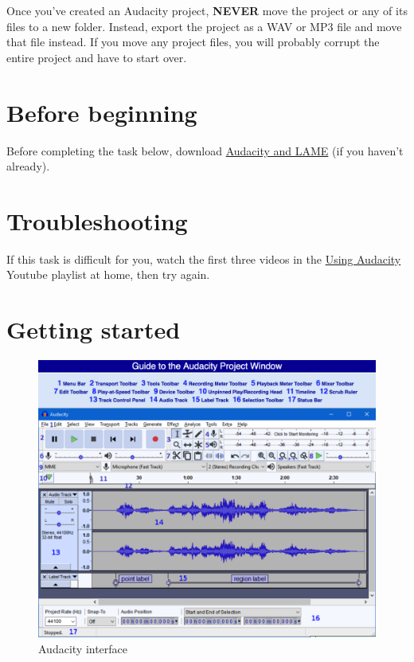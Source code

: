 \documentclass[]{book}
\theoremstyle{definition}
\theoremstyle{definition}
\theoremstyle{definition}
\theoremstyle{remark}
\begin{document}
Once you've created an Audacity project, \textbf{NEVER} move the project
or any of its files to a new folder. Instead, export the project as a
WAV or MP3 file and move that file instead. If you move any project
files, you will probably corrupt the entire project and have to start
over.

\hypertarget{before-beginning}{%
\section{Before beginning}\label{before-beginning}}

Before completing the task below, download
\href{https://canvas.vt.edu/courses/73626/assignments/486486}{Audacity
and LAME} (if you haven't already).

\hypertarget{troubleshooting}{%
\section{Troubleshooting}\label{troubleshooting}}

If this task is difficult for you, watch the first three videos in the
\href{https://www.youtube.com/playlist?list=PLy3KiJOHvdl1epxRuzEQqjQu1V9szwqnl}{Using
Audacity} Youtube playlist at home, then try again.

\hypertarget{getting-started}{%
\section{Getting started}\label{getting-started}}

\begin{figure}
\centering
\includegraphics{audacity-interface.png}
\caption{Audacity interface}
\end{figure}
\end{document}
